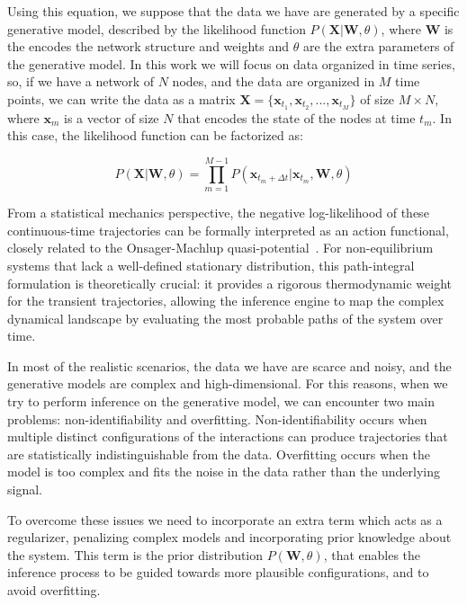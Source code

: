\documentclass[10pt, aps, rmp,  twocolumn, superscriptaddress, floatfix, showkeys]{revtex4-2}
\begin{document}
Using this equation, we suppose that the data we have are generated by a specific generative model, described by the likelihood function $P(\mathbf{X}|\mathbf{W}, \theta)$, where $\mathbf{W}$ is the encodes the network structure and weights and $\theta$ are the extra parameters of the generative model. 
In this work we will focus on data organized in time series, so, if we have a network of $N$ nodes, and the data are organized in $M$ time points, we can write the data as a matrix $\mathbf{X} = \{\mathbf{x}_{t_1}, \mathbf{x}_{t_2}, ..., \mathbf{x}_{t_M}\}$ of size $M \times N$, where $\mathbf{x}_m$ is a vector of size $N$ that encodes the state of the nodes at time $t_m$. In this case, the likelihood function can be factorized as:

\begin{equation}
    P(\mathbf{X}|\mathbf{W}, \theta) = \prod_{m=1}^{M-1} P(\mathbf{x}_{t_m+\Delta t}|\mathbf{x}_{t_m}, \mathbf{W}, \theta)
    \label{eq:general_likelihood}
\end{equation}

From a statistical mechanics perspective, the negative log-likelihood of these continuous-time trajectories can be formally interpreted as an action functional, closely related to the Onsager-Machlup quasi-potential~\cite{onsager1953fluctuations}. For non-equilibrium systems that lack a well-defined stationary distribution, this path-integral formulation is theoretically crucial: it provides a rigorous thermodynamic weight for the transient trajectories, allowing the inference engine to map the complex dynamical landscape by evaluating the most probable paths of the system over time.

In most of the realistic scenarios, the data we have are scarce and noisy, and the generative models are complex and high-dimensional. For this reasons, when we try to perform inference on the generative model, we can encounter two main problems: non-identifiability and overfitting. Non-identifiability occurs when multiple distinct configurations of the interactions can produce trajectories that are statistically indistinguishable from the data. Overfitting occurs when the model is too complex and fits the noise in the data rather than the underlying signal. 

To overcome these issues we need to incorporate an extra term which acts as a regularizer, penalizing complex models and incorporating prior knowledge about the system. This term is the prior distribution $P(\mathbf{W}, \theta)$, that enables the inference process to be guided towards more plausible configurations, and to avoid overfitting.
\end{document}
